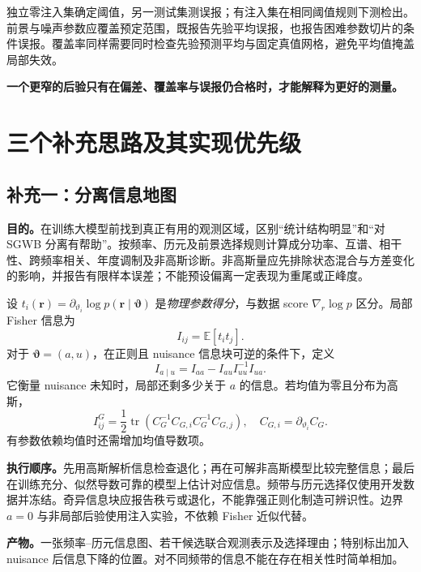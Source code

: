 \documentclass[UTF8,fontset=fandol,a4paper,11pt]{ctexart}
\numberwithin{equation}{section}
\newcommand{\E}{\mathbb E}
\newcommand{\tr}{\operatorname{tr}}
\newcommand{\btheta}{\boldsymbol\vartheta}
\newcommand{\br}{\boldsymbol r}
\newcommand{\key}[1]{\par\smallskip\noindent\colorbox{pale}{\parbox{\dimexpr\linewidth-2\fboxsep\relax}{\textbf{#1}}}\par\smallskip}
\begin{document}
独立零注入集确定阈值，另一测试集测误报；有注入集在相同阈值规则下测检出。前景与噪声参数应覆盖预定范围，既报告先验平均误报，也报告困难参数切片的条件误报。覆盖率同样需要同时检查先验预测平均与固定真值网格，避免平均值掩盖局部失效。

\key{一个更窄的后验只有在偏差、覆盖率与误报仍合格时，才能解释为更好的测量。}

\section{三个补充思路及其实现优先级}
\subsection{补充一：分离信息地图}
\textbf{目的。}在训练大模型前找到真正有用的观测区域，区别“统计结构明显”和“对 SGWB 分离有帮助”。按频率、历元及前景选择规则计算成分功率、互谱、相干性、跨频率相关、年度调制及非高斯诊断。非高斯量应先排除状态混合与方差变化的影响，并报告有限样本误差；不能预设偏离一定表现为重尾或正峰度。

设 $t_i(\br)=\partial_{\vartheta_i}\log p(\br\mid\btheta)$ 是\emph{物理参数得分}，与数据 score $\nabla_r\log p$ 区分。局部 Fisher 信息为
\begin{equation}
I_{ij}=\E[t_it_j].
\end{equation}
对于 $\btheta=(a,u)$，在正则且 nuisance 信息块可逆的条件下，定义
\begin{equation}
I_{a\mid u}=I_{aa}-I_{au}I_{uu}^{-1}I_{ua}.
\label{eq:fisher}
\end{equation}
它衡量 nuisance 未知时，局部还剩多少关于 $a$ 的信息。若均值为零且分布为高斯，
\begin{equation}
I_{ij}^{G}=\frac12\tr\left(C_G^{-1}C_{G,i}C_G^{-1}C_{G,j}\right),
\quad C_{G,i}=\partial_{\vartheta_i}C_G.
\end{equation}
有参数依赖均值时还需增加均值导数项。

\textbf{执行顺序。}先用高斯解析信息检查退化；再在可解非高斯模型比较完整信息；最后在训练充分、似然导数可靠的模型上估计对应信息。频带与历元选择仅使用开发数据并冻结。奇异信息块应报告秩亏或退化，不能靠强正则化制造可辨识性。边界 $a=0$ 与非局部后验使用注入实验，不依赖 Fisher 近似代替。

\textbf{产物。}一张频率--历元信息图、若干候选联合观测表示及选择理由；特别标出加入 nuisance 后信息下降的位置。对不同频带的信息不能在存在相关性时简单相加。
\end{document}
